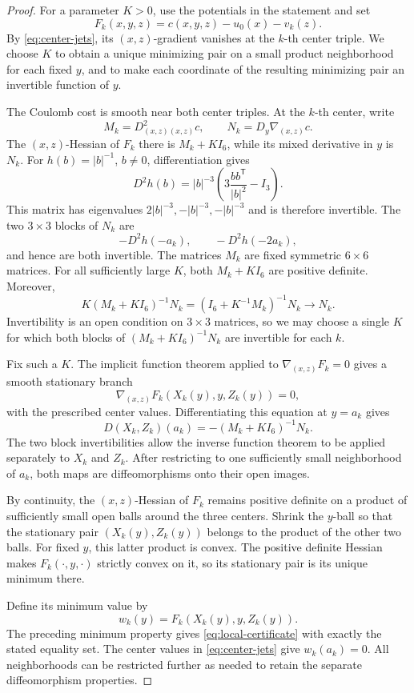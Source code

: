 \begin{proof}
For a parameter \(K>0\), use the potentials in the statement and set
\[
 F_k(x,y,z)=c(x,y,z)-u_0(x)-v_k(z).
\]
By \eqref{eq:center-jets}, its \((x,z)\)-gradient vanishes at the
\(k\)-th center triple. We choose \(K\) to obtain a unique minimizing
pair on a small product neighborhood for each fixed \(y\), and to make each coordinate of the
resulting minimizing pair an invertible function of \(y\).

The Coulomb cost is smooth near both center triples. At the
\(k\)-th center, write
\[
 M_k=D^2_{(x,z)(x,z)}c,\qquad
 N_k=D_y\nabla_{(x,z)}c.
\]
The \((x,z)\)-Hessian of \(F_k\) there is \(M_k+KI_6\), while its
mixed derivative in \(y\) is \(N_k\). For \(h(b)=|b|^{-1}\), \(b\ne0\),
differentiation gives
\begin{equation}\label{eq:pair-hessian}
 D^2h(b)=|b|^{-3}
 \left(3\frac{bb^{\mathsf T}}{|b|^2}-I_3\right).
\end{equation}
This matrix has eigenvalues \(2|b|^{-3},-|b|^{-3},-|b|^{-3}\)
and is therefore invertible. The two \(3\times3\) blocks of \(N_k\) are
\[
 -D^2h(-a_k),\qquad -D^2h(-2a_k),
\]
and hence are both invertible. The matrices \(M_k\) are fixed
symmetric \(6\times6\) matrices. For all sufficiently large \(K\),
both \(M_k+KI_6\) are positive definite. Moreover,
\[
 K(M_k+KI_6)^{-1}N_k
   =(I_6+K^{-1}M_k)^{-1}N_k\longrightarrow N_k.
\]
Invertibility is an open condition on \(3\times3\) matrices, so
we may choose a single \(K\) for which both blocks of
\((M_k+KI_6)^{-1}N_k\) are invertible for each \(k\).

Fix such a \(K\). The implicit function theorem applied to
\(\nabla_{(x,z)}F_k=0\) gives a smooth stationary branch
\[
 \nabla_{(x,z)}F_k(X_k(y),y,Z_k(y))=0,
\]
with the prescribed center values. Differentiating this equation
at \(y=a_k\) gives
\[
 D(X_k,Z_k)(a_k)=-(M_k+KI_6)^{-1}N_k.
\]
The two block invertibilities allow the inverse function theorem
to be applied separately to \(X_k\) and \(Z_k\).
After restricting to one sufficiently small neighborhood of \(a_k\),
both maps are diffeomorphisms onto their open images.

By continuity, the \((x,z)\)-Hessian of \(F_k\) remains positive
definite on a product of sufficiently small open balls around the
three centers. Shrink the \(y\)-ball so that the stationary pair
\((X_k(y),Z_k(y))\) belongs to the product of the other two balls.
For fixed \(y\), this latter product is convex. The positive
definite Hessian makes \(F_k(\cdot,y,\cdot)\) strictly convex on it,
so its stationary pair is its unique minimum there.

Define its minimum value by
\[
 w_k(y)=F_k(X_k(y),y,Z_k(y)).
\]
The preceding minimum property gives
\eqref{eq:local-certificate} with exactly the stated equality set.
The center values in \eqref{eq:center-jets} give \(w_k(a_k)=0\).
All neighborhoods can be restricted further as needed to retain
the separate diffeomorphism properties.
\end{proof}
